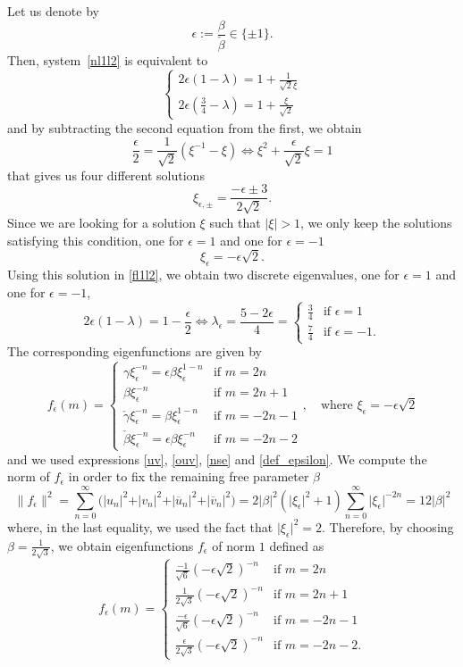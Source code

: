 \documentclass[11pt]{amsart}
\theoremstyle{definition}
\theoremstyle{remark}
\theoremstyle{plain}
\numberwithin{equation}{section}
\numberwithin{lemma}{section}
\numberwithin{definition}{section}
\numberwithin{proposition}{section}
\numberwithin{corollary}{section}
\numberwithin{theorem}{section}
\numberwithin{remark}{section}
\begin{document}
Let us denote by 
\begin{equation} \label{def_epsilon}
 \epsilon:=\frac{\beta}{ \check{\beta}}\in\{\pm1\}.
\end{equation}
Then, system~\eqref{nl1l2} is equivalent to 
\begin{equation}\label{fl1l2}
  \begin{cases} { }
2\epsilon(1-\lambda)=1+\frac{1}{\sqrt{2}\xi} \\
2\epsilon(\frac{3}{4}-\lambda)=1+\frac{\xi}{\sqrt{2}}
\end{cases}
\end{equation}
and by subtracting the second equation from the first, we obtain 
$$
\frac{\epsilon}{2}=\frac{1}{\sqrt{2}}(\xi^{-1}-\xi) \iff \xi^2+\frac{\epsilon}{\sqrt{2}}\xi=1
$$
that gives us four different solutions 
$$
\xi_{\epsilon,\pm}=\frac{-\epsilon\pm3}{2\sqrt{2}}.
$$
Since we are looking for a solution $\xi$ such that $\vert \xi \vert >1$, we only keep the solutions satisfying this condition, one for $\epsilon=1$ and one for $\epsilon=-1$
$$
\xi_\epsilon=-\epsilon\sqrt{2}.
$$ 
Using this solution in \eqref{fl1l2}, we obtain two discrete eigenvalues, one for $\epsilon=1$ and one for $\epsilon=-1$,  
$$
2\epsilon(1-\lambda)=1-\frac{\epsilon}{2} \iff \lambda_\epsilon=\frac{5-2\epsilon}{4}=
\begin{cases}
 \frac{3}{4} & \text{if }\epsilon=1 \\
 \frac{7}{4} & \text{if }\epsilon=-1.
\end{cases}
$$
The corresponding eigenfunctions are given by
$$
f_\epsilon(m)=
\begin{cases}
 \gamma \xi_\epsilon^{-n}=\epsilon\beta\xi_\epsilon^{1-n} & \text{if } m=2n \\
 \beta\xi_\epsilon^{-n}& \text{if } m=2n+1 \\
 \check{\gamma} \xi_\epsilon^{-n}=\beta\xi_\epsilon^{1-n} & \text{if } m=-2n-1 \\
 \check{\beta} \xi_\epsilon^{-n}=\epsilon\beta\xi_\epsilon^{-n} & \text{if } m=-2n-2
\end{cases},
\quad \text{where } \xi_\epsilon=-\epsilon\sqrt{2}
$$
and we used expressions \eqref{uv}, \eqref{ouv}, \eqref{nse} and \eqref{def_epsilon}.
We compute the norm of $f_\epsilon$ in order to fix the remaining free parameter $\beta$
$$
\lVert f_\epsilon \rVert^2=\sum_{n=0}^\infty \big( \vert u_n\vert^2 + \vert v_n\vert^2 + \vert\overline{u}_n\vert^2 + \vert\overline{v}_n\vert^2\big)
=2\vert\beta\vert^2 (\vert\xi_\epsilon\vert^2+1) \sum_{n=0}^\infty \vert\xi_\epsilon\vert^{-2n} 
=12\vert\beta\vert^2
$$
where, in the last equality, we used
 the fact that $\vert\xi_\epsilon\vert^2=2$.
Therefore, by choosing $\beta=\frac{1}{2\sqrt{3}}$, we obtain eigenfunctions $f_\epsilon$ of norm $1$ defined as
$$
f_\epsilon(m)=
\begin{cases}
 \frac{-1}{\sqrt{6}}(-\epsilon\sqrt{2})^{-n} & \text{if } m=2n \\
 \frac{1}{2\sqrt{3}}(-\epsilon\sqrt{2})^{-n} & \text{if } m=2n+1 \\
 \frac{-\epsilon}{\sqrt{6}}(-\epsilon\sqrt{2})^{-n} & \text{if } m=-2n-1 \\
 \frac{\epsilon}{2\sqrt{3}}(-\epsilon\sqrt{2})^{-n} & \text{if } m=-2n-2.
\end{cases}
$$
\end{document}
